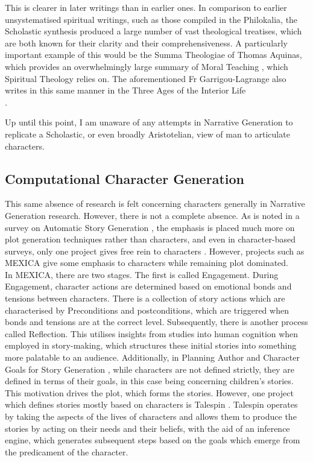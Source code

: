 \documentclass[12pt]{article}
\begin{document}
This is clearer in later writings than in earlier ones. In comparison to earlier unsystematised spiritual writings, such as those compiled in the Philokalia\cite{1983philokalia}, the Scholastic synthesis produced a large number of vast theological treatises, which are both known for their clarity and their comprehensiveness. A particularly important example of this would be the Summa Theologiae of Thomas Aquinas, which provides an overwhelmingly large summary of Moral Teaching \cite{aquinas2014summa}, which Spiritual Theology relies on. The aforementioned Fr Garrigou-Lagrange also writes in this same manner in the Three Ages of the Interior Life\\.

Up until this point, I am unaware of any attempts in Narrative Generation to replicate a Scholastic, or even broadly Aristotelian, view of man to articulate characters.\\
\subsection{Computational Character Generation}
This same absence of research is felt concerning characters generally in Narrative Generation research. However, there is not a complete absence. As is noted in a survey on Automatic Story Generation \cite{AutomaticStoryGeneration2021}, the emphasis is placed much more on plot generation techniques rather than characters, and even in character-based surveys, only one project gives free rein to characters \cite{Riedl2003CharacterfocusedNP}. However, projects such as MEXICA\cite{MEXICA} give some emphasis to characters while remaining plot dominated.\\

In MEXICA, there are two stages. The first is called Engagement. During Engagement, character actions are determined based on emotional bonds and tensions between characters. There is a collection of story actions which are characterised by Preconditions and postconditions, which are triggered when bonds and tensions are at the correct level. Subsequently, there is another process called Reflection. This utilises insights from studies into human cognition when employed in story-making, which structures these initial stories into something more palatable to an audience. Additionally, in Planning Author and Character Goals for Story Generation \cite{authorandcharactergoals}, while characters are not defined strictly, they are defined in terms of their goals, in this case being concerning children's stories. This motivation drives the plot, which forms the stories. However, one project which defines stories mostly based on characters is Talespin \cite{Meehan1977TALESPINAI}. Talespin operates by taking the aspects of the lives of characters and allows them to produce the stories by acting on their needs and their beliefs, with the aid of an inference engine, which generates subsequent steps based on the goals which emerge from the predicament of the character.  \\  
\end{document}
